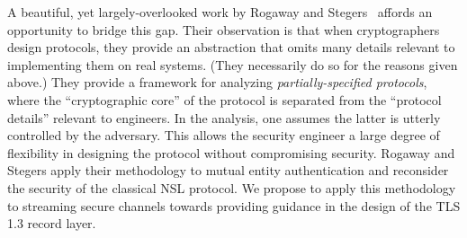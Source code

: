 \begin{task}\label{task:sc}
   
  A beautiful, yet largely-overlooked work by Rogaway and Stegers~\cite{RS09}
  affords an opportunity to bridge this gap. Their observation is that when
  cryptographers design protocols, they provide an abstraction that omits many
  details relevant to implementing them on real systems. (They necessarily do
  so for the reasons given above.)
  They provide a framework for analyzing \emph{partially-specified protocols},
  where the ``cryptographic core'' of the protocol is separated from the
  ``protocol details'' relevant to engineers. In the analysis, one assumes the
  latter is utterly controlled by the adversary. This  allows the security
  engineer a large degree of flexibility in designing the protocol without
  compromising security.
  Rogaway and Stegers apply their methodology to mutual entity authentication
  and reconsider the security of the classical NSL
  protocol.
  We propose to apply this methodology to streaming secure channels towards
  providing guidance in the design of the TLS 1.3 record layer.
\end{task}


